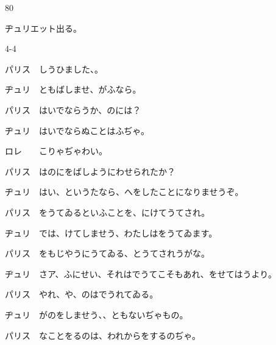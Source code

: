 \documentclass[tate,paper=b6j,jafontsize=9pt]{jlreq}
\begin{document}
\begin{azconvIndented}{8\zw}{0\zw}

ヂュリエット出る。

\end{azconvIndented}
\begin{azconvIndented}{4\zw}{-4\zw}

パリス　しうひました、。

ヂュリ　ともばしませ、がふなら。

パリス　はいでならうか、のには？

ヂュリ　はいでならぬことはふぢゃ。

ロレ　　こりゃぢゃわい。

パリス　はのにをばしようにわせられたか？

ヂュリ　はい、というたなら、へをしたことになりませうぞ。

パリス　をうてゐるといふことを、にけてうてされ。

ヂュリ　では、けてしませう、わたしはをうてゐます。

パリス　をもじやうにうてゐる、とうてされうがな。

ヂュリ　さア、ふにせい、それはでうてこそもあれ、をせてはうより。

パリス　やれ、や、のはでうれてゐる。

ヂュリ　がのをしませう、、ともないぢゃもの。

パリス　なことをるのは、われからをするのぢゃ。


\end{azconvIndented}
\end{document}
